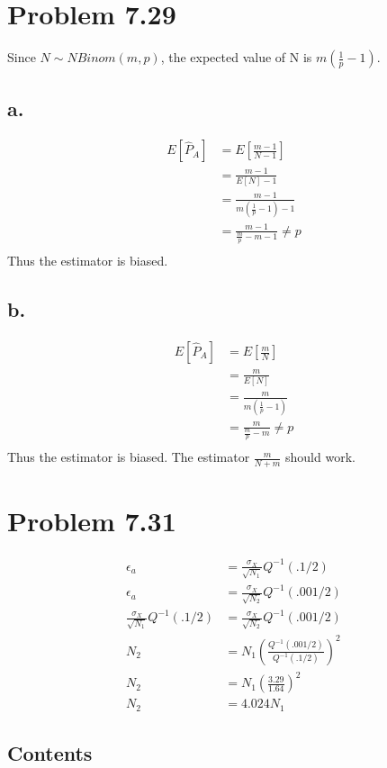 \documentclass[12pt]{article}
\begin{document}
\section{Problem 7.29}
Since $N\sim NBinom(m,p)$, the expected value of N is $m\left( \frac{1}{p} -1 \right)$. 
\subsection{a.}
\begin{align*}
  E[\hat P_A] &= E\left[ \frac{m-1}{N-1} \right] \\
  &= \frac{m-1}{E[N]-1} \\
  &= \frac{m-1}{m\left( \frac{1}{p} -1 \right)-1} \\
  &= \frac{m-1}{\frac{m}{p} -m -1} \neq p \\
\end{align*}
Thus the estimator is biased. 

\subsection{b.}
\begin{align*}
  E[\hat P_A] &= E\left[ \frac{m}{N} \right] \\
  &= \frac{m}{E[N]} \\
  &= \frac{m}{m\left( \frac{1}{p} -1 \right)} \\
  &= \frac{m}{\frac{m}{p} -m} \neq p \\
\end{align*}
Thus the estimator is biased. The estimator $\frac{m}{N+m}$ should work. 

\section{Problem 7.31}
\begin{align*}
  \epsilon_a &= \frac{\sigma_X}{\sqrt{N_1}} Q^{-1}(.1/2) \\
  \epsilon_a &= \frac{\sigma_X}{\sqrt{N_2}} Q^{-1}(.001/2) \\
  \frac{\sigma_X}{\sqrt{N_1}} Q^{-1}(.1/2) &= \frac{\sigma_X}{\sqrt{N_2}} Q^{-1}(.001/2) \\
  N_2 &= N_1\left( \frac{Q^{-1}(.001/2)}{Q^{-1}(.1/2)} \right)^2 \\
  N_2 &= N_1\left( \frac{3.29}{1.64} \right)^2 \\
  N_2 &= 4.024N_1
\end{align*}

\subsection*{Contents}
\end{document}

